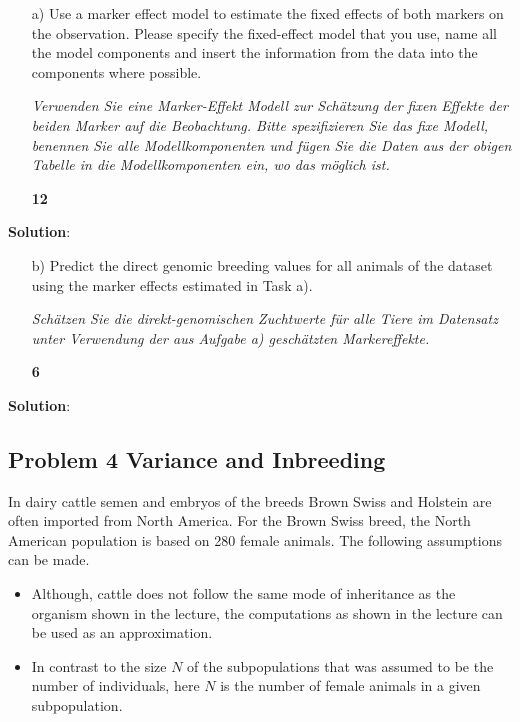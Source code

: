 \documentclass[
]{article}
\providecommand{\tightlist}{%
  \setlength{\itemsep}{0pt}\setlength{\parskip}{0pt}}
\newcommand{\points}[1]
{\begin{flushright}\textbf{#1}\end{flushright}}
\newcommand{\solstart}
{\vspace{3ex}\textbf{Solution}:}
\begin{document}
\vspace{3ex}
\begin{enumerate}
\item[a)] Use a marker effect model to estimate the fixed effects of both markers on the observation. Please specify the fixed-effect model that you use, name all the model components and insert the information from the data into the components where possible. 

\textit{Verwenden Sie eine Marker-Effekt Modell zur Schätzung der fixen Effekte der beiden Marker auf die Beobachtung. Bitte spezifizieren Sie das fixe Modell, benennen Sie alle Modellkomponenten und fügen Sie die Daten aus der obigen Tabelle in die Modellkomponenten ein, wo das möglich ist.}
\points{12}
\end{enumerate}

\solstart

\clearpage
\pagebreak

\begin{enumerate}
\item[b)] Predict the direct genomic breeding values for all animals of the dataset using the marker effects estimated in Task a). 

\textit{ Schätzen Sie die direkt-genomischen Zuchtwerte für alle Tiere im Datensatz unter Verwendung der aus Aufgabe a) geschätzten Markereffekte.}
\points{6}
\end{enumerate}

\solstart

\clearpage
\pagebreak

\hypertarget{problem-4-variance-and-inbreeding}{%
\subsection{Problem 4 Variance and
Inbreeding}\label{problem-4-variance-and-inbreeding}}

In dairy cattle semen and embryos of the breeds Brown Swiss and Holstein
are often imported from North America. For the Brown Swiss breed, the
North American population is based on 280 female animals. The following
assumptions can be made.

\begin{itemize}
\tightlist
\item
  Although, cattle does not follow the same mode of inheritance as the
  organism shown in the lecture, the computations as shown in the
  lecture can be used as an approximation.
\item
  In contrast to the size \(N\) of the subpopulations that was assumed
  to be the number of individuals, here \(N\) is the number of female
  animals in a given subpopulation.
\end{itemize}
\end{document}
